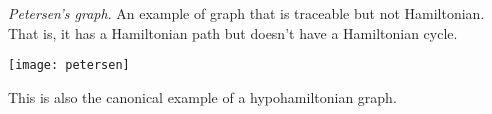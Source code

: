 \documentclass[12pt]{article}
\begin{document}
\emph{Petersen's graph}. An example of graph that is traceable but not Hamiltonian. That is, it has a Hamiltonian path but doesn't have a Hamiltonian cycle.

\begin{center}
\texttt{[image: petersen]}
\end{center}

This is also the canonical example of a hypohamiltonian graph.
\end{document}
